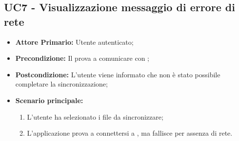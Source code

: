\subsection{UC7 - Visualizzazione messaggio di errore di rete}
\label{UC7}
\begin{itemize}
\item \textbf{Attore Primario:} Utente autenticato;
\item \textbf{Precondizione:} Il  prova a comunicare con ;
\item \textbf{Postcondizione:} L'utente viene informato che non è stato possibile completare la sincronizzazione;
\item \textbf{Scenario principale:}
    \begin{enumerate}
    \item L'utente ha selezionato i file da sincronizzare;
    \item L'applicazione prova a connettersi a , ma fallisce per assenza di rete.
    \end{enumerate}
\end{itemize}